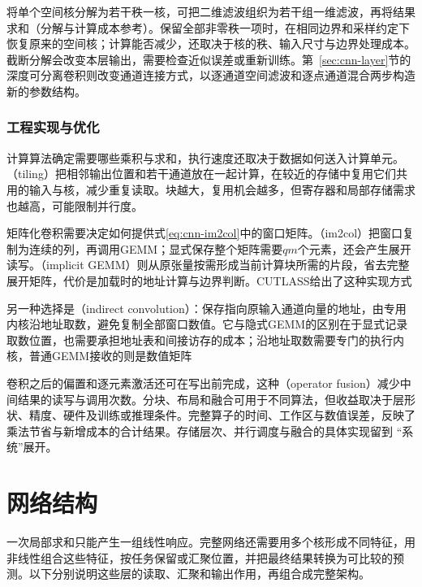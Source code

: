 将单个空间核分解为若干秩一核，可把二维滤波组织为若干组一维滤波，再将结果求和（分解与计算成本参考）。保留全部非零秩一项时，在相同边界和采样约定下恢复原来的空间核；计算能否减少，还取决于核的秩、输入尺寸与边界处理成本。截断分解会改变本层输出，需要检查近似误差或重新训练。第~\ref{sec:cnn-layer}节的深度可分离卷积则改变通道连接方式，以逐通道空间滤波和逐点通道混合两步构造新的参数结构。

\subsubsection{工程实现与优化}
\label{sec:cnn-engineering}

计算算法确定需要哪些乘积与求和，执行速度还取决于数据如何送入计算单元。（tiling）把相邻输出位置和若干通道放在一起计算，在较近的存储中复用它们共用的输入与核，减少重复读取。块越大，复用机会越多，但寄存器和局部存储需求也越高，可能限制并行度。

矩阵化卷积需要决定如何提供式\eqref{eq:cnn-im2col}中的窗口矩阵。（im2col）把窗口复制为连续的列，再调用GEMM；显式保存整个矩阵需要$qm$个元素，还会产生展开读写。（implicit GEMM）则从原张量按需形成当前计算块所需的片段，省去完整展开矩阵，代价是加载时的地址计算与边界判断。CUTLASS给出了这种实现方式

另一种选择是（indirect convolution）：保存指向原输入通道向量的地址，由专用内核沿地址取数，避免复制全部窗口数值。它与隐式GEMM的区别在于显式记录取数位置，也需要承担地址表和间接访存的成本；沿地址取数需要专门的执行内核，普通GEMM接收的则是数值矩阵

卷积之后的偏置和逐元素激活还可在写出前完成，这种（operator fusion）减少中间结果的读写与调用次数。分块、布局和融合可用于不同算法，但收益取决于层形状、精度、硬件及训练或推理条件。完整算子的时间、工作区与数值误差，反映了乘法节省与新增成本的合计结果。存储层次、并行调度与融合的具体实现留到
“系统”展开。

\FloatBarrier

\section{网络结构}
\label{sec:cnn-structure}

一次局部求和只能产生一组线性响应。完整网络还需要用多个核形成不同特征，用非线性组合这些特征，按任务保留或汇聚位置，并把最终结果转换为可比较的预测。以下分别说明这些层的读取、汇聚和输出作用，再组合成完整架构。

